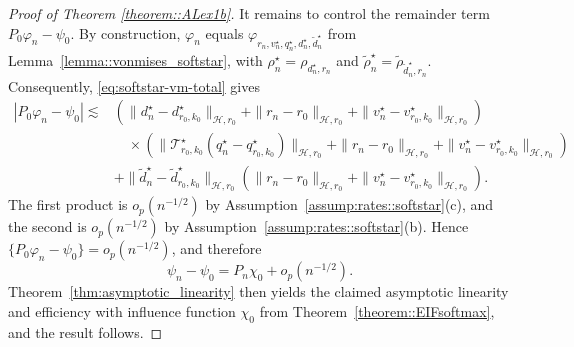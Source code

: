 \documentclass[11pt]{article}
\theoremstyle{plain}
\begin{document}
\begin{proof}[Proof of Theorem \ref{theorem::ALex1b}]
It remains to control the remainder term $P_0 \varphi_n - \psi_0$.
By construction, $\varphi_n$ equals
$\varphi_{r_n,v_n^\star,q_n^\star,d_n^\star,\widetilde d_n^\star}$ from
Lemma~\ref{lemma::vonmises_softstar}, with
$\rho_n^\star=\rho_{d_n^\star,r_n}$ and
$\widetilde\rho_n^\star=\widetilde\rho_{\widetilde d_n^\star,r_n}$.
Consequently, \eqref{eq:softstar-vm-total} gives
\begin{align*}
|P_0\varphi_n-\psi_0|
\lesssim{}&
\left(
\|d_n^\star-d_{r_0,k_0}^\star\|_{\mathcal H,r_0}
+\|r_n-r_0\|_{\mathcal H,r_0}
+\|v_n^\star-v_{r_0,k_0}^\star\|_{\mathcal H,r_0}
\right)\\
&\quad\times\left(
\|\mathcal T_{r_0,k_0}^\star(q_n^\star-q_{r_0,k_0}^\star)\|_{\mathcal H,r_0}
+\|r_n-r_0\|_{\mathcal H,r_0}
+\|v_n^\star-v_{r_0,k_0}^\star\|_{\mathcal H,r_0}
\right)\\
&+\|\widetilde d_n^\star-\widetilde d_{r_0,k_0}^\star\|_{\mathcal H,r_0}
\left(
\|r_n-r_0\|_{\mathcal H,r_0}
+\|v_n^\star-v_{r_0,k_0}^\star\|_{\mathcal H,r_0}
\right).
\end{align*}
The first product is $o_p(n^{-1/2})$ by
Assumption~\ref{assump:rates::softstar}(c), and the second is
$o_p(n^{-1/2})$ by Assumption~\ref{assump:rates::softstar}(b).
Hence $\{P_0 \varphi_n - \psi_0\} = o_p(n^{-1/2})$, and therefore
\[
\psi_n - \psi_0
= P_n \chi_0 + o_p(n^{-1/2}).
\]
Theorem~\ref{thm:asymptotic_linearity} then yields the claimed asymptotic linearity and efficiency with influence function $\chi_0$ from Theorem~\ref{theorem::EIFsoftmax}, and the result follows.
\end{proof}
\end{document}
